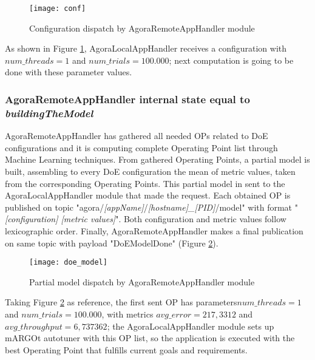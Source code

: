 \begin{figure}[ht]

    \centering
    \texttt{[image: conf]}
    \caption{Configuration dispatch by AgoraRemoteAppHandler module}
    \label{fig:conf}
    
\end{figure}

As shown in Figure \ref{fig:conf}, AgoraLocalAppHandler receives a configuration with $num\_threads = 1$ and $num\_trials = 100.000$; next computation is going to be done with these parameter values.


\subsubsection{AgoraRemoteAppHandler internal state equal to \textit{building\-The\-Model}}\label{DoEModelSend}

AgoraRemoteAppHandler has gathered all needed OPs related to DoE configurations and it is computing complete Operating Point list through Machine Learning techniques. From gathered Operating Points, a partial model is built, assembling to every DoE configuration the mean of metric values, taken from the corresponding Operating Points. This partial model in sent to the Agora\-Local\-App\-Handler module that made the request. Each obtained OP is published on topic "agora\slash{}\textit{[appName]}\slash{}\textit{[hostname]\_[PID]}\slash{}mod\-el" with format "\textit{[configuration] [metric values]}". Both configuration and metric values follow lexicographic order. Finally, AgoraRemoteAppHandler makes a final publication on same topic with payload "DoEModelDone" (Figure \ref{fig:doe_model}).

\begin{figure}[hb]

    \centering
    \texttt{[image: doe\_model]}
    \caption{Partial model dispatch by AgoraRemoteAppHandler module}
    \label{fig:doe_model}
    
\end{figure}

Taking Figure \ref{fig:doe_model} as reference, the first sent OP has parameters\linebreak $num\_threads = 1$ and $num\_trials = 100.000$, with metrics $avg\_error = 217,3312$ and $avg\_throughput = 6,737362$; the AgoraLocalAppHandler module sets up mARGOt autotuner with this OP list, so the application is executed with the best Operating Point that fulfills current goals and requirements.



